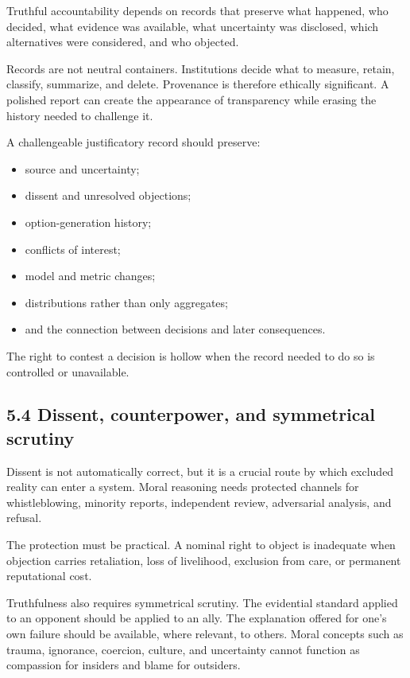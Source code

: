 \documentclass[
  11pt,
]{article}
\providecommand{\tightlist}{%
  \setlength{\itemsep}{0pt}\setlength{\parskip}{0pt}}
\begin{document}
Truthful accountability depends on records that preserve what happened,
who decided, what evidence was available, what uncertainty was
disclosed, which alternatives were considered, and who objected.

Records are not neutral containers. Institutions decide what to measure,
retain, classify, summarize, and delete. Provenance is therefore
ethically significant. A polished report can create the appearance of
transparency while erasing the history needed to challenge it.

A challengeable justificatory record should preserve:

\begin{itemize}
\tightlist
\item
  source and uncertainty;
\item
  dissent and unresolved objections;
\item
  option-generation history;
\item
  conflicts of interest;
\item
  model and metric changes;
\item
  distributions rather than only aggregates;
\item
  and the connection between decisions and later consequences.
\end{itemize}

The right to contest a decision is hollow when the record needed to do
so is controlled or unavailable.

\subsection{5.4 Dissent, counterpower, and symmetrical
scrutiny}\label{dissent-counterpower-and-symmetrical-scrutiny}

Dissent is not automatically correct, but it is a crucial route by which
excluded reality can enter a system. Moral reasoning needs protected
channels for whistleblowing, minority reports, independent review,
adversarial analysis, and refusal.

The protection must be practical. A nominal right to object is
inadequate when objection carries retaliation, loss of livelihood,
exclusion from care, or permanent reputational cost.

Truthfulness also requires symmetrical scrutiny. The evidential standard
applied to an opponent should be applied to an ally. The explanation
offered for one's own failure should be available, where relevant, to
others. Moral concepts such as trauma, ignorance, coercion, culture, and
uncertainty cannot function as compassion for insiders and blame for
outsiders.
\end{document}
